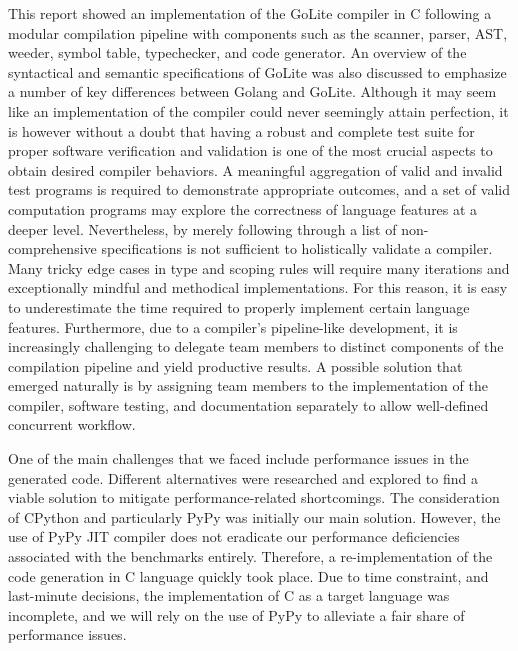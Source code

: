 \documentclass{article}
\begin{document}
This report showed an implementation of the GoLite compiler in C following a modular compilation pipeline with components such as the scanner, parser, AST, weeder, symbol table, typechecker, and code generator. An overview of the syntactical and semantic specifications of GoLite was also discussed to emphasize a number of key differences between Golang and GoLite. Although it may seem like an implementation of the compiler could never seemingly attain perfection, it is however without a doubt that having a robust and complete test suite for proper software verification and validation is one of the most crucial aspects to obtain desired compiler behaviors. A meaningful aggregation of valid and invalid test programs is required to demonstrate appropriate outcomes, and a set of valid computation programs may explore the correctness of language features at a deeper level. Nevertheless, by merely following through a list of non-comprehensive specifications is not sufficient to holistically validate a compiler. Many tricky edge cases in type and scoping rules will require many iterations and exceptionally mindful and methodical implementations. For this reason, it is easy to underestimate the time required to properly implement certain language features. Furthermore, due to a compiler’s pipeline-like development, it is increasingly challenging to delegate team members to distinct components of the compilation pipeline and yield productive results. A possible solution that emerged naturally is by assigning team members to the implementation of the compiler, software testing, and documentation separately to allow well-defined concurrent workflow. 

One of the main challenges that we faced include performance issues in the generated code. Different alternatives were researched and explored to find a viable solution to mitigate performance-related shortcomings. The consideration of CPython and particularly PyPy was initially our main solution. However, the use of PyPy JIT compiler does not eradicate our performance deficiencies associated with the benchmarks entirely. Therefore, a re-implementation of the code generation in C language quickly took place. Due to time constraint, and last-minute decisions, the implementation of C as a target language was incomplete, and we will rely on the use of PyPy to alleviate a fair share of performance issues.

\end{document}
